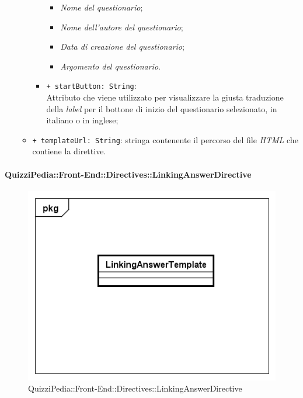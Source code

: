 \begin{itemize}
\begin{itemize}
\begin{itemize}
					\begin{itemize}
						\item \textit{Nome del questionario};
						\item \textit{Nome dell'autore del questionario};
						\item \textit{Data di creazione del questionario};
						\item \textit{Argomento del questionario}.
					\end{itemize}
					\item \texttt{+ startButton: String}: \\ Attributo che viene utilizzato per visualizzare la giusta traduzione della \textit{label} per il bottone di inizio del questionario selezionato, in italiano o in inglese; 
				\end{itemize}
				\item \texttt{+ templateUrl: String}: stringa contenente il percorso del file \textit{HTML} che contiene la direttive.
			\end{itemize}
		\end{itemize}
		
		\paragraph{QuizziPedia::Front-End::Directives::LinkingAnswerDirective}
		
		\label{QuizziPedia::Front-End::Directives::LinkingAnswerDirective}
		
		\begin{figure}[ht]
			\centering
			\includegraphics[scale=0.80,keepaspectratio]{UML/Classi/Front-End/QuizziPedia_Front-end_Templates_LinkingAnswerTemplate.png}
			\caption{QuizziPedia::Front-End::Directives::LinkingAnswerDirective}
		\end{figure} \FloatBarrier		
		
